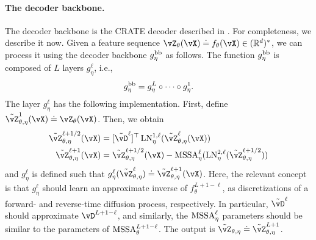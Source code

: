 \documentclass[../../book-main.tex]{subfiles}
\begin{document}
\paragraph{The decoder backbone.} The decoder backbone is the CRATE decoder described in . For completeness, we describe it now. Given a feature sequence \(\vZ_{\theta}(\vX) \doteq f_{\theta}(\vX) \in (\R^{d})^{*}\), we can process it using the decoder backbone \(g_{\eta}^{\mathrm{bb}}\) as follows. The function \(g_{\eta}^{\mathrm{bb}}\) is composed of \(L\) layers \(g_{\eta}^{\ell}\), i.e.,
\begin{equation}
    g_{\eta}^{\mathrm{bb}} = g_{\eta}^{L} \circ \cdots \circ g_{\eta}^{1}.
\end{equation}
The layer \(g_{\eta}^{\ell}\) has the following implementation. First, define \(\tilde{\vZ}_{\theta, \eta}^{1}(\vX) \doteq \vZ_{\theta}(\vX)\). Then, we obtain
\begin{align}
    \tilde{\vZ}_{\theta, \eta}^{\ell + 1/2}(\vX) 
    &= [\tilde{\vD}^{\ell}]^{\top}\LN_{\eta}^{1, \ell}(\tilde{\vZ}_{\theta, \eta}^{\ell}(\vX)) \\ 
    \tilde{\vZ}_{\theta, \eta}^{\ell + 1}(\vX)
    &= \tilde{\vZ}_{\theta, \eta}^{\ell + 1/2}(\vX) - \MSSA_{\eta}^{\ell}(\LN_{\eta}^{2, \ell}(\tilde{\vZ}_{\theta, \eta}^{\ell + 1/2}))
\end{align}
and \(g_{\eta}^{\ell}\) is defined such that \(g_{\eta}^{\ell}(\tilde{\vZ}_{\theta, \eta}^{\ell}) \doteq \tilde{\vZ}_{\theta, \eta}^{\ell + 1}(\vX)\). Here, the relevant concept is that \(g_{\eta}^{\ell}\) should learn an approximate inverse of \(f_{\theta}^{L + 1 - \ell}\), as discretizations of a forward- and reverse-time diffusion process, respectively. In particular, \(\tilde{\vD}^{\ell}\) should approximate \(\vD^{L + 1 - \ell}\), and similarly, the \(\operatorname{MSSA}_{\eta}^{\ell}\) parameters should be similar to the parameters of \(\operatorname{MSSA}_{\theta}^{L + 1 - \ell}\). The output is \(\tilde{\vZ}_{\theta, \eta} \doteq \tilde{\vZ}_{\theta, \eta}^{L + 1}\).
\end{document}
